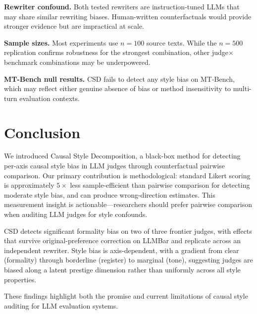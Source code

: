 \documentclass[11pt,a4paper]{article}
\begin{document}
\textbf{Rewriter confound.} Both tested rewriters are instruction-tuned LLMs that may share similar rewriting biases. Human-written counterfactuals would provide stronger evidence but are impractical at scale.

\textbf{Sample sizes.} Most experiments use $n{=}100$ source texts. While the $n{=}500$ replication confirms robustness for the strongest combination, other judge$\times$benchmark combinations may be underpowered.

\textbf{MT-Bench null results.} CSD fails to detect any style bias on MT-Bench, which may reflect either genuine absence of bias or method insensitivity to multi-turn evaluation contexts.

\section{Conclusion}
\label{sec:conclusion}

We introduced Causal Style Decomposition, a black-box method for detecting per-axis causal style bias in LLM judges through counterfactual pairwise comparison.
Our primary contribution is methodological: standard Likert scoring is approximately $5{\times}$ less sample-efficient than pairwise comparison for detecting moderate style bias, and can produce wrong-direction estimates.
This measurement insight is actionable---researchers should prefer pairwise comparison when auditing LLM judges for style confounds.

CSD detects significant formality bias on two of three frontier judges, with effects that survive original-preference correction on LLMBar and replicate across an independent rewriter.
Style bias is axis-dependent, with a gradient from clear (formality) through borderline (register) to marginal (tone), suggesting judges are biased along a latent prestige dimension rather than uniformly across all style properties.

These findings highlight both the promise and current limitations of causal style auditing for LLM evaluation systems.
\end{document}
